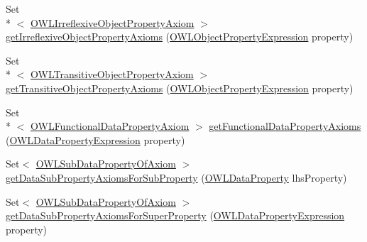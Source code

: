 \begin{DoxyCompactItemize}
\item 
Set\\*
$<$ \hyperlink{interfaceorg_1_1semanticweb_1_1owlapi_1_1model_1_1_o_w_l_irreflexive_object_property_axiom}{O\-W\-L\-Irreflexive\-Object\-Property\-Axiom} $>$ \hyperlink{classuk_1_1ac_1_1manchester_1_1cs_1_1owl_1_1owlapi_1_1_o_w_l_ontology_impl_ae64d48872a06fc724269220632e2ddbb}{get\-Irreflexive\-Object\-Property\-Axioms} (\hyperlink{interfaceorg_1_1semanticweb_1_1owlapi_1_1model_1_1_o_w_l_object_property_expression}{O\-W\-L\-Object\-Property\-Expression} property)
\item 
Set\\*
$<$ \hyperlink{interfaceorg_1_1semanticweb_1_1owlapi_1_1model_1_1_o_w_l_transitive_object_property_axiom}{O\-W\-L\-Transitive\-Object\-Property\-Axiom} $>$ \hyperlink{classuk_1_1ac_1_1manchester_1_1cs_1_1owl_1_1owlapi_1_1_o_w_l_ontology_impl_ae77d4d76d538950962fdcf5d00a1954e}{get\-Transitive\-Object\-Property\-Axioms} (\hyperlink{interfaceorg_1_1semanticweb_1_1owlapi_1_1model_1_1_o_w_l_object_property_expression}{O\-W\-L\-Object\-Property\-Expression} property)
\item 
Set\\*
$<$ \hyperlink{interfaceorg_1_1semanticweb_1_1owlapi_1_1model_1_1_o_w_l_functional_data_property_axiom}{O\-W\-L\-Functional\-Data\-Property\-Axiom} $>$ \hyperlink{classuk_1_1ac_1_1manchester_1_1cs_1_1owl_1_1owlapi_1_1_o_w_l_ontology_impl_a421ba36b356cce44c7ac39c5582add07}{get\-Functional\-Data\-Property\-Axioms} (\hyperlink{interfaceorg_1_1semanticweb_1_1owlapi_1_1model_1_1_o_w_l_data_property_expression}{O\-W\-L\-Data\-Property\-Expression} property)
\item 
Set$<$ \hyperlink{interfaceorg_1_1semanticweb_1_1owlapi_1_1model_1_1_o_w_l_sub_data_property_of_axiom}{O\-W\-L\-Sub\-Data\-Property\-Of\-Axiom} $>$ \hyperlink{classuk_1_1ac_1_1manchester_1_1cs_1_1owl_1_1owlapi_1_1_o_w_l_ontology_impl_a2f209ec090d6a70a9cd9d7cf813edb24}{get\-Data\-Sub\-Property\-Axioms\-For\-Sub\-Property} (\hyperlink{interfaceorg_1_1semanticweb_1_1owlapi_1_1model_1_1_o_w_l_data_property}{O\-W\-L\-Data\-Property} lhs\-Property)
\item 
Set$<$ \hyperlink{interfaceorg_1_1semanticweb_1_1owlapi_1_1model_1_1_o_w_l_sub_data_property_of_axiom}{O\-W\-L\-Sub\-Data\-Property\-Of\-Axiom} $>$ \hyperlink{classuk_1_1ac_1_1manchester_1_1cs_1_1owl_1_1owlapi_1_1_o_w_l_ontology_impl_a41c83eac96e6bb3d4217eb9ab3751ed7}{get\-Data\-Sub\-Property\-Axioms\-For\-Super\-Property} (\hyperlink{interfaceorg_1_1semanticweb_1_1owlapi_1_1model_1_1_o_w_l_data_property_expression}{O\-W\-L\-Data\-Property\-Expression} property)

\end{DoxyCompactItemize}
